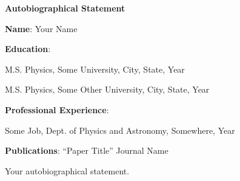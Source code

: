 

\begin{center}

\textbf{Autobiographical Statement}
\end{center}
\noindent
\textbf{Name}:
\noindent
Your Name
\singlespacing

\noindent
\textbf{Education}:

\noindent
M.S. Physics, Some University, City, State, Year

\noindent
M.S. Physics, Some Other University, City, State, Year

\noindent
\textbf{Professional Experience}:

\noindent
Some Job, Dept. of Physics and Astronomy, Somewhere, Year

\noindent
\textbf{Publications}: ``Paper Title'' Journal Name

\doublespacing

\singlespacing
Your autobiographical statement.
